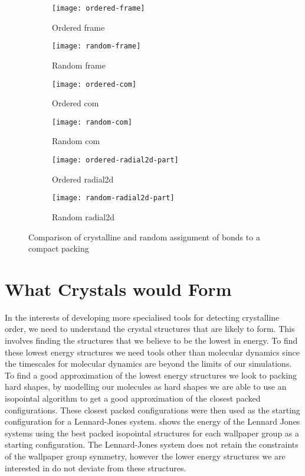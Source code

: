 \begin{figure}
    \begin{subfigure}{0.5\textwidth}
        \texttt{[image: ordered-frame]}
        \caption{Ordered frame}
        \label{fig:ordered frame}
    \end{subfigure}
    \begin{subfigure}{0.5\textwidth}
        \texttt{[image: random-frame]}
        \caption{Random frame}
        \label{fig:random frame}
    \end{subfigure}
    \begin{subfigure}{0.5\textwidth}
        \texttt{[image: ordered-com]}
        \caption{Ordered com}
        \label{fig:ordered com}
    \end{subfigure}
    \begin{subfigure}{0.5\textwidth}
        \texttt{[image: random-com]}
        \caption{Random com}
        \label{fig:random com}
    \end{subfigure}
    \begin{subfigure}{0.5\textwidth}
        \texttt{[image: ordered-radial2d-part]}
        \caption{Ordered radial2d}
        \label{fig:ordered radial2d}
    \end{subfigure}
    \begin{subfigure}{0.5\textwidth}
        \texttt{[image: random-radial2d-part]}
        \caption{Random radial2d}
        \label{fig:random radial2d}
    \end{subfigure}
    \caption{Comparison of crystalline and random assignment of bonds to a compact packing}
    \label{fig:compact bonds}
\end{figure}

\section{What Crystals would Form}

In the interests of developing more specialised tools for detecting crystalline order, we need to understand the crystal structures that are likely to form. This involves finding the structures that we believe to be the lowest in energy. To find these lowest energy structures we need tools other than molecular dynamics since the timescales for molecular dynamics are beyond the limits of our simulations. To find a good approximation of the lowest energy structures we look to packing hard shapes, by modelling our molecules as hard shapes we are able to use an isopointal algorithm to get a good approximation of the closest packed configurations. These closest packed configurations were then used as the starting configuration for a Lennard-Jones system.  shows the energy of the Lennard Jones systems using the best packed isopointal structures for each wallpaper group as a starting configuration. The Lennard-Jones system does not retain the constraints of the wallpaper group symmetry, however the lower energy structures we are interested in do not deviate from these structures.

